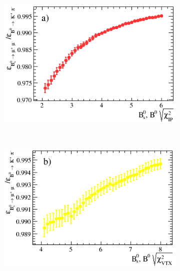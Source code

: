 \begin{figure}[htbp]
    \centering
    \begin{subfigure}[b]{0.48\textwidth}
        \includegraphics[width=\textwidth]{./Figs/Selection/Bs2MuMu_KPi_IP.png}
        \label{fig:IPS_ratioKPi}
    \end{subfigure}
    ~ %
    \begin{subfigure}[b]{0.48\textwidth}
        \includegraphics[width=\textwidth]{./Figs/Selection/BSMuMu_KPi_vertex.png}
        \label{fig:CHI2_ratioKPi}
    \end{subfigure}
    ~ %


\end{figure}
